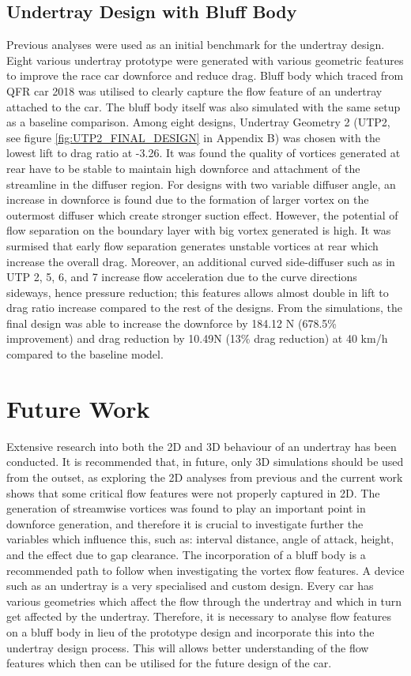 \subsection{Undertray Design with Bluff Body}
Previous analyses were used as an initial benchmark for the undertray design. Eight various undertray prototype were generated with various geometric features to improve the race car downforce and reduce drag. Bluff body which traced from QFR car 2018 was utilised to clearly capture the flow feature of an undertray attached to the car. The bluff body itself was also simulated with the same setup as a baseline comparison. Among eight designs, Undertray Geometry 2 (UTP2, see figure \ref{fig:UTP2_FINAL_DESIGN} in Appendix B) was chosen with the lowest lift to drag ratio at -3.26. It was found the quality of vortices generated at rear have to be stable to maintain high downforce and attachment of the streamline in the diffuser region. For designs with two variable diffuser angle, an increase in downforce is found due to the formation of larger vortex on the outermost diffuser which create stronger suction effect. However, the potential of flow separation on the boundary layer with big vortex generated is high. It was surmised that early flow separation generates unstable vortices at rear which increase the overall drag. Moreover, an additional curved side-diffuser such as in UTP 2, 5, 6, and 7 increase flow acceleration due to the curve directions sideways, hence pressure reduction; this features allows almost double in lift to drag ratio increase compared to the rest of the designs. From the simulations, the final design was able to increase the downforce by 184.12 N (678.5\% improvement) and drag reduction by 10.49N (13\% drag reduction) at 40 km/h compared to the baseline model.


\section{Future Work}
\noindent Extensive research into both the 2D and 3D behaviour of an undertray has been conducted. It is recommended that, in future, only 3D simulations should be used from the outset, as exploring the 2D analyses from previous and the current work shows that some critical flow features were not properly captured in 2D. The generation of streamwise vortices was found to play an important point in downforce generation, and therefore it is crucial to investigate further the variables which influence this, such as: interval distance, angle of attack, height, and the effect due to gap clearance. The incorporation of a bluff body is a recommended path to follow when investigating the vortex flow features. A device such as an undertray is a very specialised and custom design. Every car has various geometries which affect the flow through the undertray and which in turn get affected by the undertray. Therefore, it is necessary to analyse flow features on a bluff body in lieu of the prototype design and incorporate this into the undertray design process. This will allows better understanding of the flow features which then can be utilised for the future design of the car.


